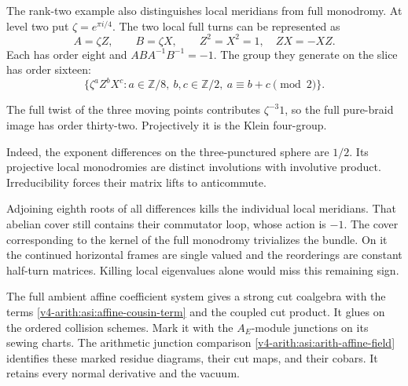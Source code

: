 The rank-two example also distinguishes local meridians from
full monodromy. At level two put \(\zeta=e^{\pi i/4}\).
The two local full turns can be represented as
\[
 A=\zeta Z,\qquad B=\zeta X,\qquad
 Z^2=X^2=1,\quad ZX=-XZ.
\]
Each has order eight and \(ABA^{-1}B^{-1}=-1\).
The group they generate on the slice has order sixteen:
\[
 \{\zeta^aZ^bX^c:
       a\in\mathbb Z/8,\ b,c\in\mathbb Z/2,\
       a\equiv b+c\pmod2\}.
\]

The full twist of the three moving points contributes
\(\zeta^{-3}1\), so the full pure-braid image has order thirty-two.
Projectively it is the Klein four-group.

Indeed, the exponent differences on the three-punctured sphere
are \(1/2\). Its projective local monodromies are distinct
involutions with involutive product. Irreducibility forces
their matrix lifts to anticommute.

Adjoining eighth roots of all differences kills the individual
local meridians. That abelian cover still contains their
commutator loop, whose action is \(-1\).
The cover corresponding to the kernel of the full monodromy
trivializes the bundle. On it the continued horizontal frames
are single valued and the reorderings are constant half-turn
matrices. Killing local eigenvalues alone would miss this
remaining sign.

\begin{proposition}\label{v4-arith:asi:e6-geometric-comparison}
The full ambient affine coefficient system gives a strong cut coalgebra
with the terms \eqref{v4-arith:asi:affine-cousin-term} and the coupled cut
product. It glues on the ordered collision schemes. Mark it with the
$A_E$-module junctions on its sewing charts. The arithmetic junction
comparison \eqref{v4-arith:asi:arith-affine-field} identifies these marked
residue diagrams, their cut maps, and their cobars. It retains every
normal derivative and the vacuum.
\end{proposition}

